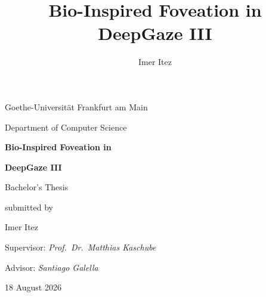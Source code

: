 \documentclass[
  paper=a4,
  fontsize=11pt,
  twoside=false,
  BCOR=10mm,
  DIV=11,
  parskip=half,
  numbers=noenddot,
  bibliography=totoc,
  listof=totoc,
  open=any,
  chapterprefix=true,
]{scrreprt}
\title{Bio-Inspired Foveation in DeepGaze III}
\author{Imer Itez}
\begin{document}
\begin{titlepage}
  \centering
  \vspace*{2cm}
  {\Large Goethe-Universit\"at Frankfurt am Main \par}
  \vspace{0.5cm}
  {\large Department of Computer Science\par}
  \vspace{2.5cm}
  {\Huge\bfseries Bio-Inspired Foveation in \par}
  \vspace{0.3cm}
  {\Huge\bfseries DeepGaze III \par}
  \vspace{2cm}
  {\Large Bachelor's Thesis \par}
  \vspace{1.5cm}
  {\large submitted by \par}
  \vspace{0.3cm}
  {\Large Imer Itez \par}
  \vfill
  {\large Supervisor: \emph{Prof.\ Dr.\ Matthias Kaschube}\par}
  \vspace{0.2cm}
  {\large Advisor: \emph{Santiago Galella}\par}
  \vspace{0.3cm}
  {\large 18 August 2026 \par}
\end{titlepage}

\cleardoublepage
\end{document}
